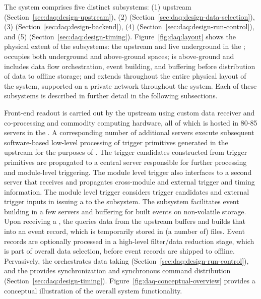 The   system comprises five distinct subsystems:
%
(1) upstream  (Section~\ref{sec:daq:design-upstream}),
%
(2)  (Section~\ref{sec:daq:design-data-selection}),
%
(3)  (Section~\ref{sec:daq:design-backend}), 
%
(4)  (Section~\ref{sec:daq:design-run-control}), and
%
(5)  (Section~\ref{sec:daq:design-timing}).
%
Figure~\ref{fig:daq:layout} shows the physical extent of the subsystems: the
upstream  and   live underground in the ;  occupies
both underground and above-ground spaces;  is above-ground
and includes data flow orchestration, event building, and buffering before distribution of data
to offline storage; and  extends throughout the entire physical layout of the
system, supported on a private network throughout the  system. Each of these subsystems is described in further
detail in the following subsections. 



Front-end readout is carried out by the upstream  using
custom data receiver and
co-processing  and commodity computing hardware, 
all of which is hosted in 80-85 servers in the . A
corresponding number of additional servers execute
subsequent software-based low-level processing of trigger
primitives
generated in the upstream  for the purposes of . 
The trigger candidates constructed from trigger primitives are propagated to a central server responsible
for further processing and module-level triggering. The module level
trigger also
interfaces to a second server that receives and
propagates cross-module and external trigger and timing
information. The module level trigger considers trigger candidates and
external trigger inputs in issuing a  to the 
subsystem. The  subsystem 
facilitates event building in a few servers and buffering for built
events on non-volatile storage. Upon receiving a , the 
 queries
data from the upstream  buffers and builds that into an event
record, which is temporarily stored in (a number of) files. Event records are optionally processed in a high-level
filter/data reduction stage, which is part of overall data selection,
 before event records are shipped to  offline. Pervasively,
 the   orchestrates data taking 
 (Section~\ref{sec:daq:design-run-control}), and the
  provides synchronization and synchronous command distribution
 (Section~\ref{sec:daq:design-timing}). Figure~\ref{fig:daq-conceptual-overview}
 provides a conceptual illustration of the overall  system
 functionality.



